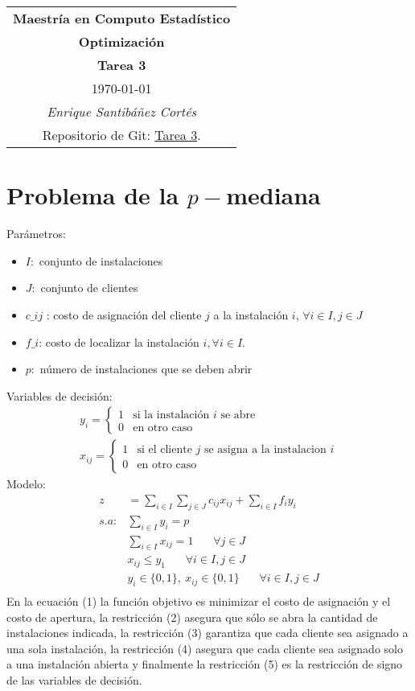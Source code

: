 \documentclass[11pt,letterpaper]{article}
\begin{document}
\begin{table}[ht]
\centering
\begin{tabular}{c}
\textbf{Maestría en Computo Estadístico}\\
\textbf{Optimización}\\
\textbf{Tarea 3}\\
\today \\
\emph{Enrique Santibáñez Cortés}\\
Repositorio de Git: \href{https://https://github.com/Enriquesec/Optimizacion/tree/master/tareas/tarea_3}{Tarea 3}.
\end{tabular}
\end{table}

\section*{Problema de la $p-$mediana}
Parámetros:
\begin{itemize}
\item $I:$ conjunto de instalaciones
\item $J:$ conjunto de clientes
\item $c\_ij$ : costo de asignación del cliente $j$ a la instalación $i$, $\forall i \in I, j \in J$

\item $f\_i$: costo de localizar la instalación $i, \forall i \in I$.

\item $p:$ número de instalaciones que se deben abrir
\end{itemize}
Variables de decisión:
\begin{align*}
y_i= \left\{\begin{array}{cc}
1 & \text{si la instalación } i \text{ se abre}\\
0 & \text{en otro caso}
\end{array} \right.\\
x_{ij}=\left\{\begin{array}{cc}
1 & \text{si el cliente } j \text{ se asigna a la instalacion } i\\
0 & \text{en otro caso}
\end{array} \right.
\end{align*}
Modelo:
\begin{align}
z &= \sum_{i\in I} \sum_{j\in J} c_{ij}x_{ij}+\sum_{i\in I} f_i y_i\\
s.a:& \sum_{i\in I} y_i =p\\
&\sum_{i\in I} x_{ij} =1\ \ \ \ \ \ \ \ \forall j \in J\\
&x_{ij}\leq y_1  \ \ \ \ \ \ \ \ \forall i \in I, j \in J \\
&y_i\in\{ 0,1\},\ x_{ij}\in \{ 0,1\}\ \ \ \ \ \ \ \ \forall i \in I, j \in J \\
\end{align}
En la ecuación (1) la función objetivo es minimizar el costo de asignación y el costo de apertura, la
restricción (2) asegura que sólo se abra la cantidad de instalaciones indicada, la restricción (3) garantiza
que cada cliente sea asignado a una sola instalación, la restricción (4) asegura que cada cliente sea
asignado solo a una instalación abierta y finalmente la restricción (5) es la restricción de signo de las
variables de decisión.
\end{document}
